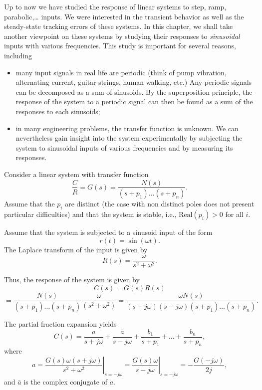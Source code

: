 \documentclass[a4paper,11pt]{report}
\theoremstyle{definition}
\begin{document}
Up to now we have studied the response of linear systems to step,
ramp, parabolic,\dots{} inputs. We were interested in the transient
behavior as well as the steady-state tracking errors of these systems.
In this chapter, we shall take another viewpoint on these systems by
studying their responses to \emph{sinusoidal} inputs with various
frequencies. This study is important for several reasons, including
\begin{itemize}
\item many input signals in real life are periodic (think of pump
  vibration, alternating current, guitar strings, human walking,
  etc.) Any periodic signals can be decomposed as a sum of
  sinusoids. By the superposition principle, the response of the
  system to a periodic signal can then be found as a sum of the
  responses to each sinusoids;
\item in many engineering problems, the transfer function is
  unknown. We can nevertheless gain insight into the system
  experimentally by subjecting the system to sinusoidal inputs of
  various frequencies and by measuring its responses.
\end{itemize}




Consider a linear system with transfer function
\[
\frac{C}{R}= G(s) = \frac{N(s)}{(s+p_1)\dots (s+p_n)}.
\]
Assume that the $p_i$ are distinct (the case with non distinct poles
does not present particular difficulties) and that the system is
stable, i.e., $\mathrm{Real}(p_i)>0$ for all $i$.

Assume that the system is subjected to a sinusoid input of the form
\[
r(t) = \sin(\omega t).
\]
The Laplace transform of the input is given by
\[
R(s) = \frac{\omega}{s^2+\omega^2}.
\]

Thus, the response of the system is given by
\[
C(s) = G(s)R(s) 
\]
\[
=\frac{N(s)}{(s+p_1)\dots (s+p_n)}\frac{\omega}{(s^2+\omega ^2)} =  
\frac{\omega N(s)}{(s+j\omega)(s-j\omega)(s+p_1)\dots (s+p_n)}.
\]

The partial fraction expansion yields
\begin{equation}
  \label{eq:pfe}
  C(s) = \frac{a}{s+j\omega} + \frac{\bar a}{s-j\omega} +
  \frac{b_1}{s+p_1} + \dots + \frac{b_n}{s+p_n},
\end{equation}
where 
\[
a =
\left.\frac{G(s)\omega(s+j\omega)}{s^2+\omega^2}\right|_{s=-j\omega} = 
\left.\frac{G(s)\omega}{s-j\omega}\right|_{s=-j\omega} = -\frac{G(-j\omega)}{2j},
\]
and $\bar a$ is the complex conjugate of $a$.
\end{document}
